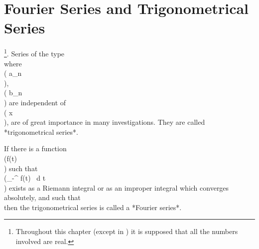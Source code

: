 %
%
\chapter{Fourier Series and Trigonometrical Series}
\footnote{Throughout
  this chapter (except in ) it is supposed that all
  the numbers involved are real.}.
Series of the type
\\[ \begin{align*}
  \frac{1}{2} a_{0}
  + (a_{1} + \cos x + b_{1} \sin x)
  + (a_{2} + \cos 2x + b_{2} \sin 2x)
  + \cdots
  \\
  &
  \hfill
  \frac{1}{2} a_{0}
  +
  \sum_{n=1}^{\infty} ( a_{n} \cos n x + b_{n} \sin n x),
\end{align*} \\]
where \\( a_{n}\\), \\( b_{n}\\) are independent of \\( x\\), are of great importance in many
investigations. They are called *trigonometrical series*.

If there is a function \\(f(t)\\) such that
\\(\int_{-\pi}^{\pi} f(t) \, d t\\) exists as a Riemann
integral or as an improper integral which converges absolutely, and such that
\\[ 
\pi a_{n} = \int_{-\pi}^{\pi}\! f(t) \cos nt \, d t,
\quad
\pi b_{n} = \int_{-\pi}^{\pi}\! f(t) \sin nt \, d t,
\\] 
then the trigonometrical series is called a *Fourier series*.

